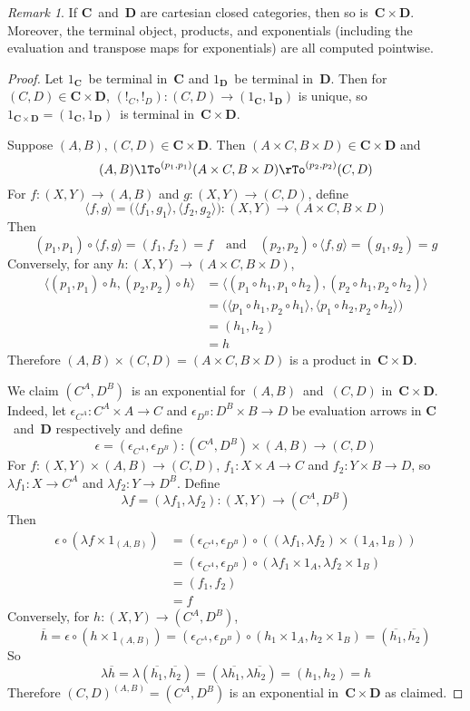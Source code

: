 \documentclass[letterpaper,12pt]{article}
\newcommand{\after}{\circ}
\newcommand{\eval}{\epsilon}
\newcommand{\term}{{!}}
\newcommand{\pair}[2]{\langle{#1},{#2}\rangle}
\newcommand{\cat}[1]{\mathbf{#1}}
\newcommand{\curry}[1]{\lambda{#1}}
\newcommand{\uncurry}[1]{\overline{#1}}
\newcommand{\C}{\cat{C}}
\newcommand{\D}{\cat{D}}
\theoremstyle{definition}
\theoremstyle{remark}
\newtheorem*{rmk}{Remark}
\theoremstyle{direction}
\begin{document}
\begin{rmk}
If \(\C\)~and~\(\D\) are cartesian closed categories, then so is~\(\C\times\D\). Moreover, the terminal object, products, and exponentials (including the evaluation and transpose maps for exponentials) are all computed pointwise.
\end{rmk}
\begin{proof}
Let \(1_{\C}\)~be terminal in~\(\C\) and \(1_{\D}\)~be terminal in~\(\D\). Then for \((C,D)\in\C\times\D\), \((\term_C,\term_D):(C,D)\to(1_{\C},1_{\D})\) is unique, so \(1_{\C\times\D}=(1_{\C},1_{\D})\)~is terminal in~\(\C\times\D\).

Suppose \((A,B),(C,D)\in\C\times\D\). Then \((A\times C,B\times D)\in\C\times\D\) and
\[(A,B)\lTo^{(p_1,p_1)}(A\times C,B\times D)\rTo^{(p_2,p_2)}(C,D)\]
For \(f:(X,Y)\to(A,B)\) and \(g:(X,Y)\to(C,D)\), define
\[\pair{f}{g}=\bigl(\pair{f_1}{g_1},\pair{f_2}{g_2}\bigr):(X,Y)\to(A\times C,B\times D)\]
Then
\[(p_1,p_1)\after\pair{f}{g}=(f_1,f_2)=f\quad\text{and}\quad(p_2,p_2)\after\pair{f}{g}=(g_1,g_2)=g\]
Conversely, for any \(h:(X,Y)\to(A\times C,B\times D)\),
\begin{align*}
\pair{(p_1,p_1)\after h}{(p_2,p_2)\after h}&=\pair{(p_1\after h_1,p_1\after h_2)}{(p_2\after h_1,p_2\after h_2)}\\
	&=\bigl(\pair{p_1\after h_1}{p_2\after h_1},\pair{p_1\after h_2}{p_2\after h_2}\bigr)\\
	&=(h_1,h_2)\\
	&=h
\end{align*}
Therefore \((A,B)\times(C,D)=(A\times C,B\times D)\) is a product in~\(\C\times\D\).

We claim \((C^A,D^B)\)~is an exponential for \((A,B)\)~and~\((C,D)\) in~\(\C\times\D\). Indeed, let \(\eval_{C^A}:C^A\times A\to C\) and \(\eval_{D^B}:D^B\times B\to D\) be evaluation arrows in \(\C\)~and~\(\D\) respectively and define
\[\eval=(\eval_{C^A},\eval_{D^B}):(C^A,D^B)\times(A,B)\to(C,D)\]
For \(f:(X,Y)\times(A,B)\to(C,D)\), \(f_1:X\times A\to C\) and \(f_2:Y\times B\to D\), so \(\curry{f_1}:X\to C^A\) and \(\curry{f_2}:Y\to D^B\). Define
\[\curry{f}=(\curry{f_1},\curry{f_2}):(X,Y)\to(C^A,D^B)\]
Then
\begin{align*}
\eval\after(\curry{f}\times 1_{(A,B)})&=(\eval_{C^A},\eval_{D^B})\after((\curry{f_1},\curry{f_2})\times(1_A,1_B))\\
	&=(\eval_{C^A},\eval_{D^B})\after(\curry{f_1}\times1_A,\curry{f_2}\times1_B)\\
	&=(f_1,f_2)\\
	&=f
\end{align*}
Conversely, for \(h:(X,Y)\to(C^A,D^B)\),
\[\uncurry{h}=\eval\after(h\times1_{(A,B)})=(\eval_{C^A},\eval_{D^B})\after(h_1\times1_A,h_2\times1_B)=(\uncurry{h_1},\uncurry{h_2})\]
So
\[\curry{\uncurry{h}}=\curry{(\uncurry{h_1},\uncurry{h_2})}=(\curry{\uncurry{h_1}},\curry{\uncurry{h_2}})=(h_1,h_2)=h\]
Therefore \((C,D)^{(A,B)}=(C^A,D^B)\) is an exponential in~\(\C\times\D\) as claimed.
\end{proof}
\end{document}
